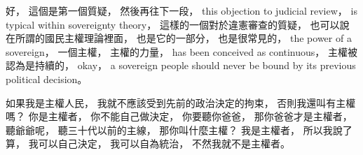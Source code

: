 \hypertarget{w02:cue:1992}{}好，
\hypertarget{w02:cue:1993}{}這個是第一個質疑，
\hypertarget{w02:cue:1994}{}然後再往下一段，
\hypertarget{w02:cue:1995}{}this objection to judicial review，
\hypertarget{w02:cue:1996}{}is typical within sovereignty theory，
\hypertarget{w02:cue:1997}{}這樣的一個對於違憲審查的質疑，
\hypertarget{w02:cue:1998}{}也可以說在所謂的國民主權理論裡面，
\hypertarget{w02:cue:1999}{}也是它的一部分，
\hypertarget{w02:cue:2000}{}也是很常見的，
\hypertarget{w02:cue:2001}{}the power of a sovereign，
\hypertarget{w02:cue:2002}{}一個主權，
\hypertarget{w02:cue:2003}{}主權的力量，
\hypertarget{w02:cue:2004}{}has been conceived as continuous，
\hypertarget{w02:cue:2005}{}主權被認為是持續的，
\hypertarget{w02:cue:2006}{}okay，
\hypertarget{w02:cue:2007}{}a sovereign people should never be bound by its previous political decision。

\hypertarget{w02:cue:2008}{}如果我是主權人民，
\hypertarget{w02:cue:2009}{}我就不應該受到先前的政治決定的拘束，
\hypertarget{w02:cue:2010}{}否則我還叫有主權嗎？
\hypertarget{w02:cue:2011}{}你是主權者，
\hypertarget{w02:cue:2012}{}你不能自己做決定，
\hypertarget{w02:cue:2013}{}你要聽你爸爸，
\hypertarget{w02:cue:2014}{}那你爸爸才是主權者，
\hypertarget{w02:cue:2015}{}聽爺爺呢，
\hypertarget{w02:cue:2016}{}聽三十代以前的主線，
\hypertarget{w02:cue:2017}{}那你叫什麼主權？
\hypertarget{w02:cue:2018}{}我是主權者，
\hypertarget{w02:cue:2019}{}所以我說了算，
\hypertarget{w02:cue:2020}{}我可以自己決定，
\hypertarget{w02:cue:2021}{}我可以自為統治，
\hypertarget{w02:cue:2022}{}不然我就不是主權者。

